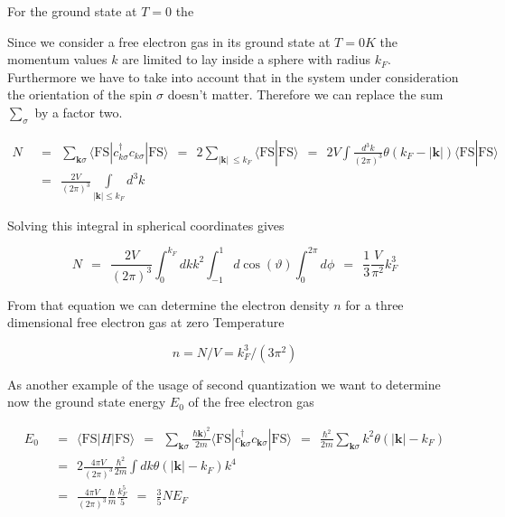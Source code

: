 \documentclass[10pt]{report}
\numberwithin{equation}{chapter}
\begin{document}
For the ground state at $T=0$ the 

Since we consider a free electron gas in its ground state at $T=0K$ the momentum values $k$ are limited to lay inside a sphere with radius $k_F$. Furthermore we have to take into account that in the system under consideration the orientation  of the spin $\sigma$ doesn't matter. Therefore we can replace the sum $\sum_\sigma$ by a factor two. 


\begin{align}
  N ~~& =~~ \sum_{\mathbf{k} \sigma} \langle \text{FS} | c_{k\sigma}^\dag c_{k\sigma} | \text{FS} \rangle ~~=~~ 2 \sum_{|\mathbf{k}|\ \leq k_F} \langle \text{FS} | \text{FS} \rangle
  ~~=~~ 2V \int \frac{d^3k}{(2\pi)^3} \theta(k_F - |\mathbf{k}|) \langle \text{FS} | \text{FS} \rangle \nonumber \\
  ~~& =~~ \frac{2V}{(2\pi)^3} \underset{|\mathbf{k}| \leq k_F}{\int} d^3k
\end{align}

Solving this integral in spherical coordinates gives

\begin{equation}
  N ~~=~~ \frac{2V}{(2\pi)^3} \int_0^{k_F} dk k^2 \int_{-1}^1 d\cos(\vartheta) \int_0^{2\pi} d\phi
  ~~=~~ \frac{1}{3} \frac{V}{\pi^2} k_F^3
\end{equation}

From that equation we can determine the electron density  $n$ for a  three dimensional free electron gas at zero Temperature 

\begin{equation}\label{eq:el_density}
  n = N/V = k_F^3/(3\pi^2)
\end{equation}


As another example of the usage of second quantization we want to determine now the ground state energy $E_0$ of the free electron gas

\begin{align}
  E_0 ~~& =~~ \langle \text{FS} | H | \text{FS} \rangle 
  ~~=~~ \sum_{\mathbf{k} \sigma} \frac{\hbar \mathbf{k})^2}{2m} \langle \text{FS} | c^\dag_{\mathbf{k} \sigma} c_{\mathbf{k} \sigma} | \text{FS} \rangle
  ~~=~~ \frac{\hbar^2}{2m} \sum_{\mathbf{k}\sigma} k^2 \theta(|\mathbf{k}| - k_F) \nonumber \\ 
  ~~& =~~ 2 \frac{4\pi V}{(2\pi)^3} \frac{\hbar^2}{2m} \int dk \theta(|\mathbf{k}| - k_F) k^4\nonumber \\
  ~~& =~~ \frac{4\pi V}{(2\pi)^3} \frac{\hbar}{m} \frac{k_F^5}{5} ~~=~~ \frac{3}{5} N E_F
\end{align}
\end{document}
